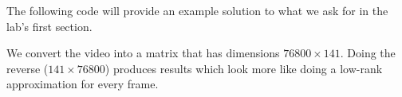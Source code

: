 The following code will provide an example solution to what we ask for in the lab's first section.


We convert the video into a matrix that has dimensions $76800 \times 141$. Doing the reverse ($141 \times 76800$) produces results which look more like doing a low-rank approximation for every frame.